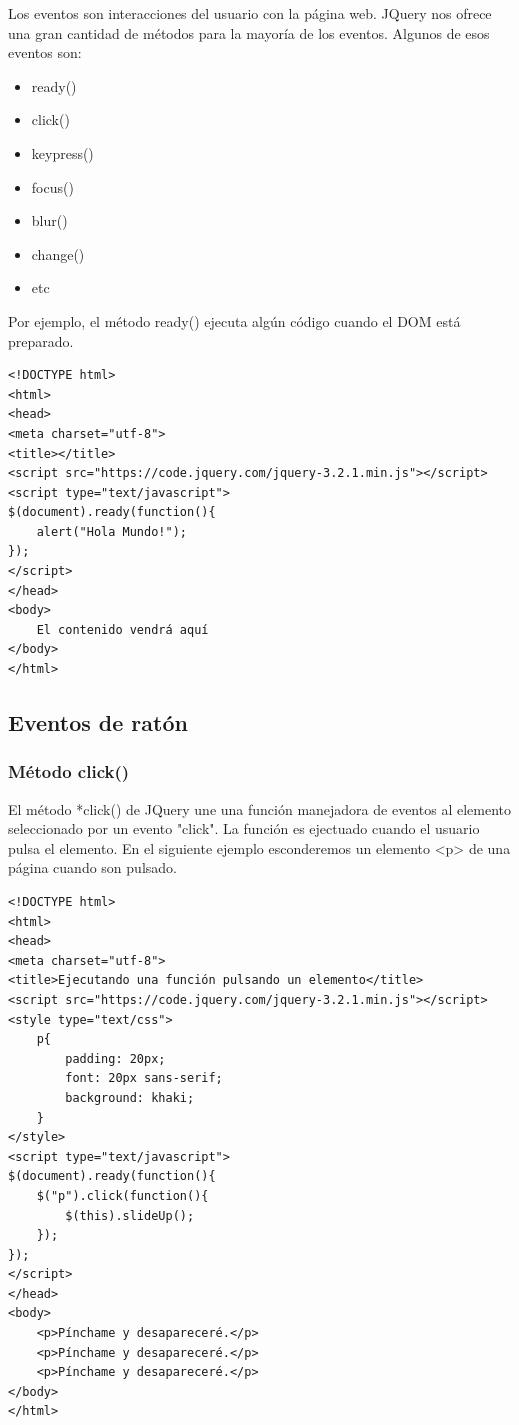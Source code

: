 \documentclass[11pt]{article}
\begin{document}
Los eventos son interacciones del usuario con la página web. JQuery nos ofrece una gran cantidad de métodos para la mayoría de los eventos. Algunos de esos eventos son:

\begin{itemize}
\item ready()
\item click()
\item keypress()
\item focus()
\item blur()
\item change()
\item etc
\end{itemize}

Por ejemplo, el método ready() ejecuta algún código cuando el DOM está preparado.

\begin{verbatim}
<!DOCTYPE html>
<html>
<head>
<meta charset="utf-8">
<title></title>
<script src="https://code.jquery.com/jquery-3.2.1.min.js"></script>
<script type="text/javascript">
$(document).ready(function(){
    alert("Hola Mundo!");
});
</script> 
</head>
<body>
    El contenido vendrá aquí
</body>
</html>         
\end{verbatim}

\subsection*{Eventos de ratón}
\label{sec:orge460457}

\subsubsection*{Método click()}
\label{sec:orgc79a88c}

El método *click() de JQuery une una función manejadora de eventos al elemento seleccionado por un evento "click". La función es ejectuado cuando el usuario pulsa el elemento. En el siguiente ejemplo esconderemos un elemento <p> de una página cuando son pulsado.

\begin{verbatim}
<!DOCTYPE html>
<html>
<head>
<meta charset="utf-8">
<title>Ejecutando una función pulsando un elemento</title>
<script src="https://code.jquery.com/jquery-3.2.1.min.js"></script>
<style type="text/css">
    p{
        padding: 20px;
        font: 20px sans-serif;
        background: khaki;
    }
</style>
<script type="text/javascript">
$(document).ready(function(){
    $("p").click(function(){
        $(this).slideUp();
    });
});
</script>
</head>
<body>
    <p>Pínchame y desapareceré.</p>
    <p>Pínchame y desapareceré.</p>
    <p>Pínchame y desapareceré.</p>
</body>
</html>                                		
\end{verbatim}
\end{document}
